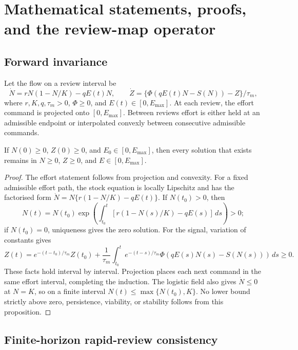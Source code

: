 \section{Mathematical statements, proofs, and the review-map operator}\label{si:math}

\subsection{Forward invariance}

Let the flow on a review interval be
\[
\dot N=rN(1-N/K)-qE(t)N,\qquad
\dot Z=\{\Phi(qE(t)N-S(N))-Z\}/\tau_m,
\]
where \(r,K,q,\tau_m>0\), \(\Phi\geq0\), and \(E(t)\in[0,E_{\max}]\). At each review, the effort command is projected onto \([0,E_{\max}]\). Between reviews effort is either held at an admissible endpoint or interpolated convexly between consecutive admissible commands.

\begin{proposition}\label{prop:invariance}
If \(N(0)\geq0\), \(Z(0)\geq0\), and \(E_0\in[0,E_{\max}]\), then every solution that exists remains in \(N\geq0\), \(Z\geq0\), and \(E\in[0,E_{\max}]\).
\end{proposition}
\begin{proof}
The effort statement follows from projection and convexity. For a fixed admissible effort path, the stock equation is locally Lipschitz and has the factorised form \(\dot N=N\{r(1-N/K)-qE(t)\}\). If \(N(t_0)>0\), then
\[
N(t)=N(t_0)\exp\!\left(\int_{t_0}^{t}[r(1-N(s)/K)-qE(s)]\,ds\right)>0;
\]
if \(N(t_0)=0\), uniqueness gives the zero solution. For the signal, variation of constants gives
\[
Z(t)=e^{-(t-t_0)/\tau_m}Z(t_0)+\frac{1}{\tau_m}\int_{t_0}^{t}e^{-(t-s)/\tau_m}\Phi(qE(s)N(s)-S(N(s)))\,ds\geq0.
\]
These facts hold interval by interval. Projection places each next command in the same effort interval, completing the induction. The logistic field also gives \(\dot N\leq0\) at \(N=K\), so on a finite interval \(N(t)\leq\max\{N(t_0),K\}\). No lower bound strictly above zero, persistence, viability, or stability follows from this proposition.
\end{proof}

\subsection{Finite-horizon rapid-review consistency}

